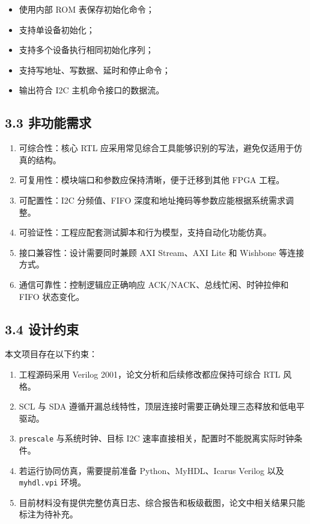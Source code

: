 \begin{itemize}
\tightlist
\item
  使用内部 ROM 表保存初始化命令；
\item
  支持单设备初始化；
\item
  支持多个设备执行相同初始化序列；
\item
  支持写地址、写数据、延时和停止命令；
\item
  输出符合 I2C 主机命令接口的数据流。
\end{itemize}

\subsection{3.3 非功能需求}\label{ux975eux529fux80fdux9700ux6c42}

\begin{enumerate}
\def\labelenumi{\arabic{enumi}.}
\tightlist
\item
  可综合性：核心 RTL
  应采用常见综合工具能够识别的写法，避免仅适用于仿真的结构。
\item
  可复用性：模块端口和参数应保持清晰，便于迁移到其他 FPGA 工程。
\item
  可配置性：I2C 分频值、FIFO 深度和地址掩码等参数应能根据系统需求调整。
\item
  可验证性：工程应配套测试脚本和行为模型，支持自动化功能仿真。
\item
  接口兼容性：设计需要同时兼顾 AXI Stream、AXI Lite 和 Wishbone
  等连接方式。
\item
  通信可靠性：控制逻辑应正确响应 ACK/NACK、总线忙闲、时钟拉伸和 FIFO
  状态变化。
\end{enumerate}

\subsection{3.4 设计约束}\label{ux8bbeux8ba1ux7ea6ux675f}

本文项目存在以下约束：

\begin{enumerate}
\def\labelenumi{\arabic{enumi}.}
\tightlist
\item
  工程源码采用 Verilog 2001，论文分析和后续修改都应保持可综合 RTL 风格。
\item
  SCL 与 SDA
  遵循开漏总线特性，顶层连接时需要正确处理三态释放和低电平驱动。
\item
  \passthrough{\lstinline!prescale!} 与系统时钟、目标 I2C
  速率直接相关，配置时不能脱离实际时钟条件。
\item
  若运行协同仿真，需要提前准备 Python、MyHDL、Icarus Verilog 以及
  \passthrough{\lstinline!myhdl.vpi!} 环境。
\item
  目前材料没有提供完整仿真日志、综合报告和板级截图，论文中相关结果只能标注为待补充。
\end{enumerate}

